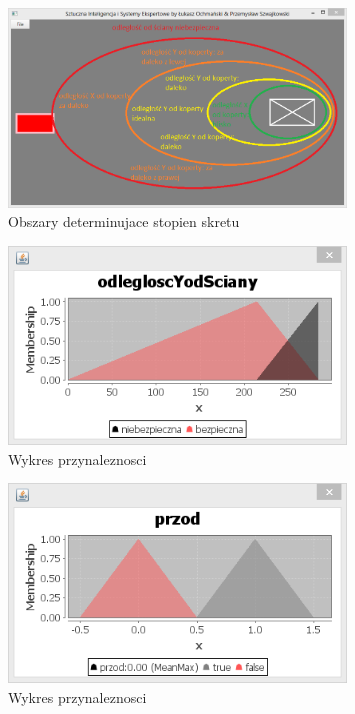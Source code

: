 \documentclass{classrep}
\begin{document}
\begin{figure}[ht]
\centering
	\includegraphics[width=0.8\textwidth,natwidth=610,natheight=642]{pictures/Obraz14.png}
	\caption{Obszary determinujace stopien skretu}
	\label{fig:Obszary determinujace stopien skretu}
\end{figure}

\begin{figure}[ht]
\centering
	\includegraphics[width=0.8\textwidth,natwidth=610,natheight=642]{pictures/Obraz02.png}
	\caption{Wykres przynaleznosci}
	\label{fig:Wykres przynaleznosci}
\end{figure}

\begin{figure}[ht]
\centering
	\includegraphics[width=0.8\textwidth,natwidth=610,natheight=642]{pictures/Obraz03.png}
	\caption{Wykres przynaleznosci}
	\label{fig:Wykres przynaleznosci}
\end{figure}
\end{document}
